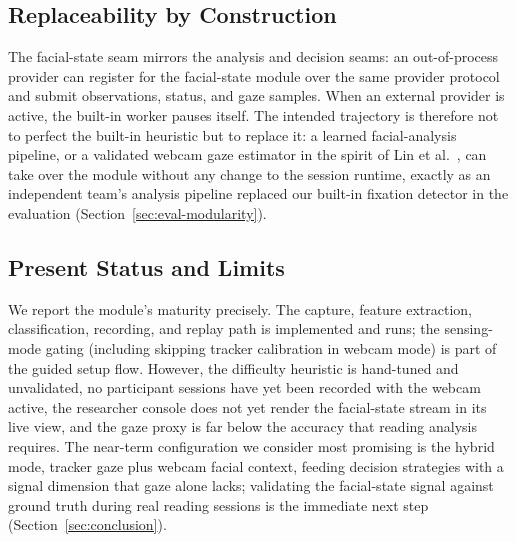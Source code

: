\subsection{Replaceability by Construction}

The facial-state seam mirrors the analysis and decision seams: an out-of-process provider can register for the facial-state module over the same provider protocol and submit observations, status, and gaze samples.
When an external provider is active, the built-in worker pauses itself.
The intended trajectory is therefore not to perfect the built-in heuristic but to replace it: a learned facial-analysis pipeline, or a validated webcam gaze estimator in the spirit of Lin et al.~\cite{lin2022webcam}, can take over the module without any change to the session runtime, exactly as an independent team's analysis pipeline replaced our built-in fixation detector in the evaluation (Section~\ref{sec:eval-modularity}).

\subsection{Present Status and Limits}

We report the module's maturity precisely.
The capture, feature extraction, classification, recording, and replay path is implemented and runs; the sensing-mode gating (including skipping tracker calibration in webcam mode) is part of the guided setup flow.
However, the difficulty heuristic is hand-tuned and unvalidated, no participant sessions have yet been recorded with the webcam active, the researcher console does not yet render the facial-state stream in its live view, and the gaze proxy is far below the accuracy that reading analysis requires.
The near-term configuration we consider most promising is the hybrid mode, tracker gaze plus webcam facial context, feeding decision strategies with a signal dimension that gaze alone lacks; validating the facial-state signal against ground truth during real reading sessions is the immediate next step (Section~\ref{sec:conclusion}).
